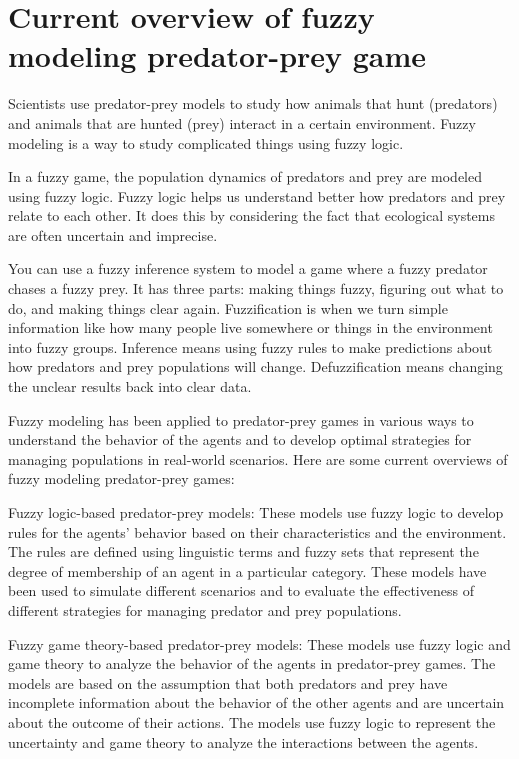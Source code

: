 \section{Current overview of fuzzy modeling predator-prey game} \label{sec:scenarios}

Scientists use predator-prey models to study how animals that hunt (predators) and animals that are hunted (prey) interact in a certain environment. Fuzzy modeling is a way to study complicated things using fuzzy logic.

In a fuzzy game, the population dynamics of predators and prey are modeled using fuzzy logic. Fuzzy logic helps us understand better how predators and prey relate to each other. It does this by considering the fact that ecological systems are often uncertain and imprecise.

You can use a fuzzy inference system to model a game where a fuzzy predator chases a fuzzy prey. It has three parts: making things fuzzy, figuring out what to do, and making things clear again. Fuzzification is when we turn simple information like how many people live somewhere or things in the environment into fuzzy groups. Inference means using fuzzy rules to make predictions about how predators and prey populations will change. Defuzzification means changing the unclear results back into clear data.

Fuzzy modeling has been applied to predator-prey games in various ways to understand the behavior of the agents and to develop optimal strategies for managing populations in real-world scenarios. Here are some current overviews of fuzzy modeling predator-prey games:

Fuzzy logic-based predator-prey models: These models use fuzzy logic to develop rules for the agents' behavior based on their characteristics and the environment. The rules are defined using linguistic terms and fuzzy sets that represent the degree of membership of an agent in a particular category. These models have been used to simulate different scenarios and to evaluate the effectiveness of different strategies for managing predator and prey populations.

Fuzzy game theory-based predator-prey models: These models use fuzzy logic and game theory to analyze the behavior of the agents in predator-prey games. The models are based on the assumption that both predators and prey have incomplete information about the behavior of the other agents and are uncertain about the outcome of their actions. The models use fuzzy logic to represent the uncertainty and game theory to analyze the interactions between the agents.


